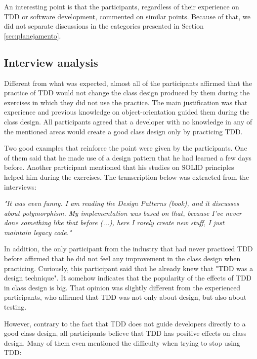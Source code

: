 \documentclass[times]{elsarticle}
\begin{document}
An interesting point is that the participants, regardless of their experience on TDD or
software development, commented on similar points. Because of that, we did not separate
discussions in the categories presented in Section \ref{sec:planejamento}.

\subsection{Interview analysis}

Different from what was expected, almost all of the participants affirmed that the
practice of TDD would not change the class design produced by them during the exercises
in which they did not use the practice.
The main justification was that experience and previous knowledge on object-orientation
guided them during the class design. All participants agreed that a developer with no
knowledge in any of the mentioned areas would create a good class design only by practicing
TDD.

Two good examples that reinforce the point were given by the participants. One of them
said that he made use of a design pattern \cite{gof} that he had learned a few days before. Another
participant mentioned that his studies on SOLID principles helped him during the exercises.
The transcription below was extracted from the interviews:

\begin{framed}
	\textit{"It was even funny. I am reading the Design Patterns (book), and it discusses about polymorphism. 
	My implementation was based on that, because I've never done something like that before (...), here I rarely
	create new stuff, I just maintain legacy code."}
\end{framed}

In addition, the only participant from the industry that had never practiced TDD before
affirmed that he did not feel any improvement in the class design when practicing.
Curiously, this participant said that he already knew that "TDD was a design technique".
It somehow indicates that the popularity of the effects of TDD in class design
is big.
That opinion was slightly different from the experienced participants, 
who affirmed that TDD was not only about design, but also about testing.

However, contrary to the fact that TDD does not guide developers directly to a
good class design, all participants believe that TDD has positive effects on class design.
Many of them even mentioned the difficulty when trying to stop using TDD:
\end{document}
